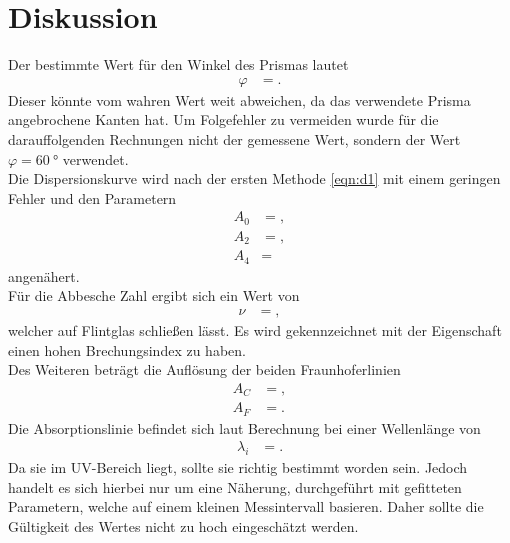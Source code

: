 \section{Diskussion}
\label{sec:Diskussion}
Der bestimmte Wert für den Winkel des Prismas lautet
\begin{align*}
  \varphi &= .
\end{align*}
Dieser könnte vom wahren Wert weit abweichen, da das verwendete Prisma angebrochene Kanten hat.
Um Folgefehler zu vermeiden wurde für die darauffolgenden Rechnungen nicht der gemessene Wert, sondern der Wert $\varphi = \SI{60}{\degree}$ verwendet.\\
Die Dispersionskurve wird nach der ersten Methode \eqref{eqn:d1} mit einem geringen Fehler und den Parametern
\begin{align*}
A_0 &= ,\\
A_2 &= ,\\
A_4 &= 
\end{align*}
angenähert.\\
Für die Abbesche Zahl ergibt sich ein Wert von
\begin{align*}
  \nu &= ,
\end{align*}
welcher auf Flintglas schließen lässt.
Es wird gekennzeichnet mit der Eigenschaft einen hohen Brechungsindex zu haben.\\
Des Weiteren beträgt die Auflösung der beiden Fraunhoferlinien
\begin{align*}
A_C &= ,\\
A_F &= .
\end{align*}
Die Absorptionslinie befindet sich laut Berechnung bei einer Wellenlänge von
\begin{align*}
  \lambda_i &= .
\end{align*}
Da sie im UV-Bereich liegt, sollte sie richtig bestimmt worden sein.
Jedoch handelt es sich hierbei nur um eine Näherung, durchgeführt mit gefitteten Parametern, welche auf einem kleinen Messintervall basieren.
Daher sollte die Gültigkeit des Wertes nicht zu hoch eingeschätzt werden.



